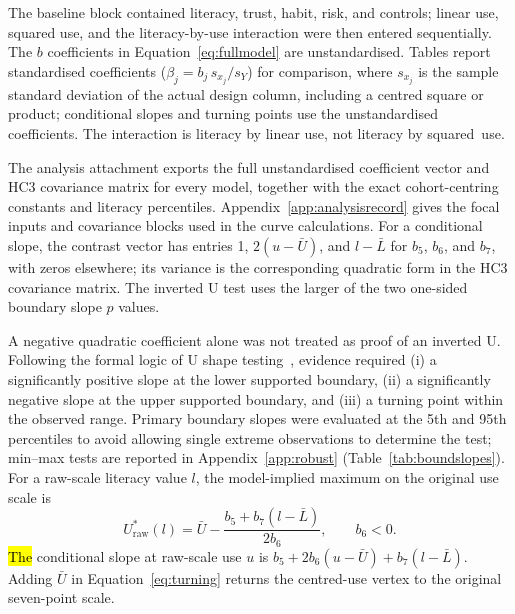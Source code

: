 \documentclass[sustainability,article,accept,moreauthors]{Definitions/mdpi}
\begin{document}
\vspace{-3pt}


The baseline block contained literacy, trust, habit, risk, and controls; linear use, squared use, and the literacy-by-use interaction were then entered sequentially. The $b$ coefficients in Equation~\eqref{eq:fullmodel} are unstandardised. Tables report standardised coefficients ($\beta_j=b_j\,s_{x_j}/s_Y$) for comparison, where $s_{x_j}$ is the sample standard deviation of the actual design column, including a centred square or product; conditional slopes and turning points use the unstandardised coefficients. The interaction is literacy by linear use, not literacy by squared~use.

The analysis attachment exports the full unstandardised coefficient vector and HC3 covariance matrix for every model, together with the exact cohort-centring constants and literacy percentiles. Appendix~\ref{app:analysisrecord} gives the focal inputs and covariance blocks used in the curve calculations. For a conditional slope, the contrast vector has entries 1, $2(u-\bar U)$, and $l-\bar L$ for $b_5$, $b_6$, and $b_7$, with zeros elsewhere; its variance is the corresponding quadratic form in the HC3 covariance matrix. The inverted U test uses the larger of the two one-sided boundary slope $p$ values.

A negative quadratic coefficient alone was not treated as proof of an inverted U. Following the formal logic of U shape testing~\cite{lind2010}, evidence required (i) a significantly positive slope at the lower supported boundary, (ii) a significantly negative slope at the upper supported boundary, and (iii) a turning point within the observed range. Primary boundary slopes were evaluated at the 5th and 95th percentiles to avoid allowing single extreme observations to determine the test; min--max tests are reported in Appendix~\ref{app:robust} (Table~\ref{tab:boundslopes}). For a raw-scale literacy value $l$, the model-implied maximum on the original use scale is
\begin{equation}
 U^{*}_{\mathrm{raw}}(l)=\bar U-\frac{b_5+b_7(l-\bar L)}{2b_6},
 \qquad b_6<0.
\label{eq:turning}
\end{equation}
\hl{The} %
 conditional slope at raw-scale use $u$ is $b_5+2b_6(u-\bar U)+b_7(l-\bar L)$. Adding $\bar U$ in Equation~\eqref{eq:turning} returns the centred-use vertex to the original seven-point scale.
\end{document}
